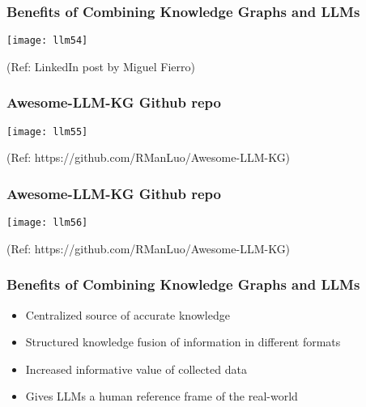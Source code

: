 \begin{frame}[fragile]\frametitle{Benefits of Combining Knowledge Graphs and LLMs}

\begin{center}
\texttt{[image: llm54]}
\end{center}	

{\tiny (Ref: LinkedIn post by Miguel Fierro)}

	
\end{frame}

\begin{frame}[fragile]\frametitle{Awesome-LLM-KG Github repo}

\begin{center}
\texttt{[image: llm55]}
\end{center}	

{\tiny (Ref: https://github.com/RManLuo/Awesome-LLM-KG)}

	
\end{frame}

\begin{frame}[fragile]\frametitle{Awesome-LLM-KG Github repo}

\begin{center}
\texttt{[image: llm56]}
\end{center}	

{\tiny (Ref: https://github.com/RManLuo/Awesome-LLM-KG)}

	
\end{frame}



\begin{frame}[fragile]\frametitle{Benefits of Combining Knowledge Graphs and LLMs}

\begin{itemize}
\item Centralized source of accurate knowledge
\item Structured knowledge fusion of information in different formats
\item Increased informative value of collected data
\item Gives LLMs a human reference frame of the real-world
\end{itemize}

\end{frame}



